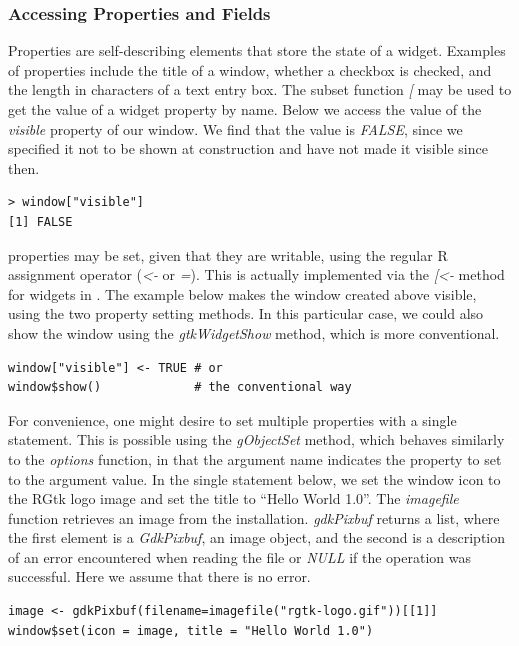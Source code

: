 \documentclass[article]{jss}
\begin{document}
\subsubsection{Accessing Properties and Fields}

Properties are self-describing elements that store the state of a widget.
Examples of properties include the title of a window, whether a checkbox is checked, and
the length in characters of a text entry box. The  subset function 
\emph{[} may be used to get the value of a widget property by name.
Below we access the value of the \emph{visible} property of our window. We
find that the value is \emph{FALSE}, since we specified it not to be shown
at construction and have not made it visible since then.
\begin{verbatim}
> window["visible"]
[1] FALSE
\end{verbatim}

 properties may be set, given that they are writable, using
the regular R assignment operator (\emph{<-} or \emph{=}). This is
actually implemented via the \emph{[<-} method for  widgets
in . The example below makes the window created above
visible, using the two property setting methods. In this particular
case, we could also show the window using the \emph{gtkWidgetShow}
method, which is more conventional.
\begin{verbatim}
window["visible"] <- TRUE # or
window$show()             # the conventional way
\end{verbatim}

For convenience, one might desire to set multiple properties with a single statement.
This is possible using the \emph{gObjectSet} method, which behaves similarly
to the  \emph{options} function, in that the argument name indicates
the property to set to the argument value. 
In the single statement below, we 
set the window icon to the RGtk logo image and set the title to ``Hello World 1.0''. 
The \emph{imagefile} function retrieves an image from the  installation.
\emph{gdkPixbuf} returns a list, where the first element is a \emph{GdkPixbuf}, an image object,
and the second is a description of an error encountered when reading the file
or \emph{NULL} if the operation was successful. Here we assume that there is no error.
\begin{verbatim}
image <- gdkPixbuf(filename=imagefile("rgtk-logo.gif"))[[1]]
window$set(icon = image, title = "Hello World 1.0")
\end{verbatim}
\end{document}
